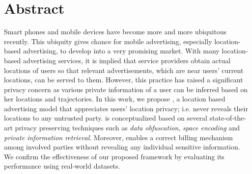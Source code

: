 \section*{Abstract}
Smart phones and mobile devices have become more and more ubiquitous recently. This ubiquity gives chance for mobile advertising, especially location-based advertising, to develop into a very promising market. With many location-based advertising services, it is implied that service providers obtain actual locations of users so that relevant advertisements, which are near users' current locations, can be served to them. However, this practice has raised a  significant privacy concern as various private information of a user can be inferred based on her locations and trajectories. In this work, we propose \codename, a location based advertising model that appreciates users' location privacy; i.e. never reveals their locations to any untrusted party. \codename is conceptualized based on several state-of-the-art privacy preserving techniques such as \textit{data obfuscation}, \textit{space encoding} and \textit{private information retrieval}. Moreover, \codename enables a correct billing mechanism among involved parties without revealing any individual sensitive information. We confirm the effectiveness of our proposed framework by evaluating its performance using real-world datasets.